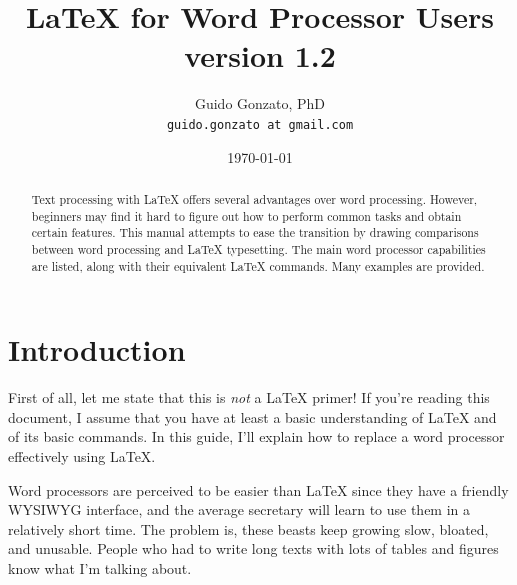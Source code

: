 \documentclass[a4paper,11pt]{article}
\def\version {1.2}
\begin{document}
\renewcommand{\democodeprefix}{}
\renewcommand{\demoresultprefix}{}


\title{\LaTeX{} for Word Processor Users\\version \version}

\author{Guido Gonzato, PhD\\
\texttt{guido.gonzato at gmail.com}}

\date{\today}

\renewcommand{\thefootnote}{\arabic{footnote}}
\setcounter{footnote}{1}

\maketitle

\begin{abstract}

  Text processing with \LaTeX{} offers several advantages over word
  processing. However, beginners may find it hard to figure out how to
  perform common tasks and obtain certain features. This manual
  attempts to ease the transition by drawing comparisons between word
  processing and \LaTeX{} typesetting. The main word processor
  capabilities are listed, along with their equivalent \LaTeX{}
  commands. Many examples are provided.

\end{abstract}

\bigskip

\begin{multicols}{2}
  \small
  \tableofcontents
  \listoftables
  \listoffigures
\end{multicols}



\section{Introduction}

First of all, let me state that this is \emph{not} a \LaTeX{} primer!
If you're reading this document, I assume that you have at least a
basic understanding of \LaTeX{} and of its basic commands. In this
guide, I'll explain how to replace a word processor effectively using
\LaTeX.

Word processors are perceived to be easier than \LaTeX{} since they
have a friendly WYSIWYG interface, and the average secretary will
learn to use them in a relatively short time. The problem is, these
beasts keep growing slow, bloated, and unusable. People who had to
write long texts with lots of tables and figures know what I'm talking
about.
\end{document}
